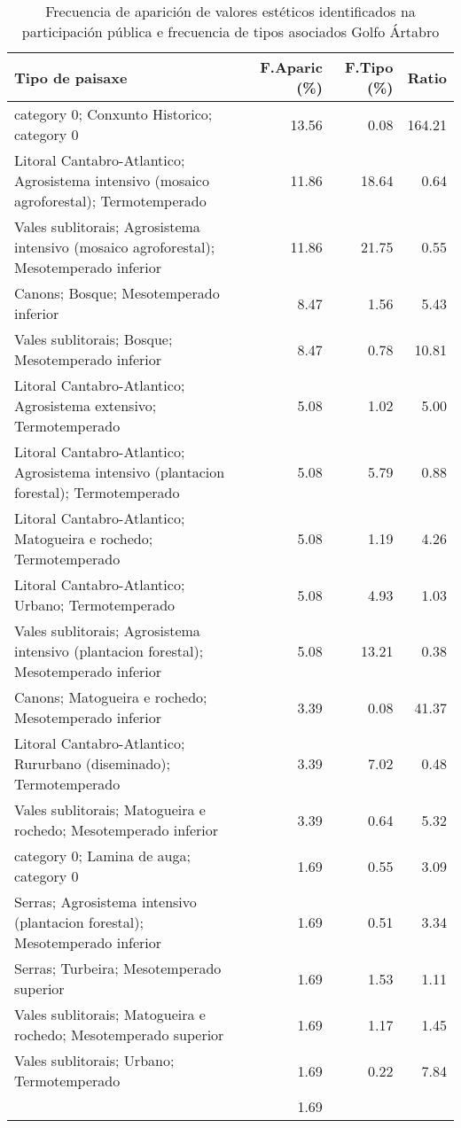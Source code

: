 \begin{table}[p]
\centering
\caption{Frecuencia de aparición de valores estéticos identificados na participación pública e frecuencia de tipos asociados Golfo Ártabro} 
\label{vsixotest1}
\begin{tabular}{lrrr}
  \hline
Tipo de paisaxe & F.Aparic (\%) & F.Tipo (\%) & Ratio \\ 
  \hline
category 0; Conxunto Historico; category 0 & 13.56 & 0.08 & 164.21 \\ 
  Litoral Cantabro-Atlantico; Agrosistema intensivo (mosaico agroforestal); Termotemperado & 11.86 & 18.64 & 0.64 \\ 
  Vales sublitorais; Agrosistema intensivo (mosaico agroforestal); Mesotemperado inferior & 11.86 & 21.75 & 0.55 \\ 
  Canons; Bosque; Mesotemperado inferior & 8.47 & 1.56 & 5.43 \\ 
  Vales sublitorais; Bosque; Mesotemperado inferior & 8.47 & 0.78 & 10.81 \\ 
  Litoral Cantabro-Atlantico; Agrosistema extensivo; Termotemperado & 5.08 & 1.02 & 5.00 \\ 
  Litoral Cantabro-Atlantico; Agrosistema intensivo (plantacion forestal); Termotemperado & 5.08 & 5.79 & 0.88 \\ 
  Litoral Cantabro-Atlantico; Matogueira e rochedo; Termotemperado & 5.08 & 1.19 & 4.26 \\ 
  Litoral Cantabro-Atlantico; Urbano; Termotemperado & 5.08 & 4.93 & 1.03 \\ 
  Vales sublitorais; Agrosistema intensivo (plantacion forestal); Mesotemperado inferior & 5.08 & 13.21 & 0.38 \\ 
  Canons; Matogueira e rochedo; Mesotemperado inferior & 3.39 & 0.08 & 41.37 \\ 
  Litoral Cantabro-Atlantico; Rururbano (diseminado); Termotemperado & 3.39 & 7.02 & 0.48 \\ 
  Vales sublitorais; Matogueira e rochedo; Mesotemperado inferior & 3.39 & 0.64 & 5.32 \\ 
  category 0; Lamina de auga; category 0 & 1.69 & 0.55 & 3.09 \\ 
  Serras; Agrosistema intensivo (plantacion forestal); Mesotemperado inferior & 1.69 & 0.51 & 3.34 \\ 
  Serras; Turbeira; Mesotemperado superior & 1.69 & 1.53 & 1.11 \\ 
  Vales sublitorais; Matogueira e rochedo; Mesotemperado superior & 1.69 & 1.17 & 1.45 \\ 
  Vales sublitorais; Urbano; Termotemperado & 1.69 & 0.22 & 7.84 \\ 
   & 1.69 &  &  \\ 
   \hline
\end{tabular}
\end{table}

